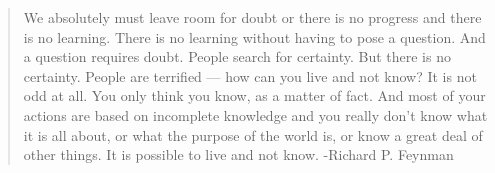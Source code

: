\phantom{.}
\vspace{4in}

\begin{singlespace}
\begin{quote}
  We absolutely must leave room for doubt or there is no progress and there is no learning. There is no learning without having to pose a question. And a question requires doubt. People search for certainty. But there is no certainty. People are terrified — how can you live and not know? It is not odd at all. You only think you know, as a matter of fact. And most of your actions are based on incomplete knowledge and you really don't know what it is all about, or what the purpose of the world is, or know a great deal of other things. It is possible to live and not know.
  \newline
  -Richard P. Feynman
\end{quote}
\end{singlespace}

%
